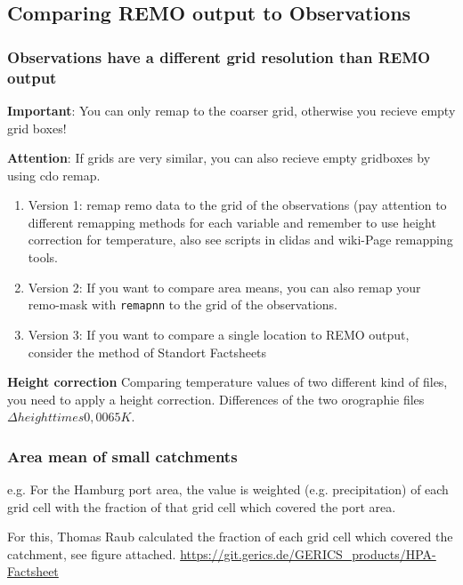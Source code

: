 \subsection{Comparing REMO output to Observations}

\subsubsection{Observations have a different grid resolution than REMO output}

\textbf{Important}: You can only remap to the coarser grid, otherwise you recieve empty grid boxes!

\textbf{Attention}: If grids are very similar, you can also recieve empty gridboxes by using cdo remap.
\begin{enumerate}
\item Version 1: remap remo data to the grid of the observations (pay attention to different remapping
methods for each variable and remember to use height correction for temperature,
also see scripts in clidas and wiki-Page remapping tools.

\item Version 2: If you want to compare area means, you can also remap your remo-mask with \texttt{remapnn} to the grid of the observations.

\item Version 3: If you want to compare a single location to REMO output, consider the method of Standort Factsheets 
\end{enumerate}

\textbf{Height correction} Comparing temperature values of two different kind of files, you need to apply a height correction. 
Differences of the two orographie files $\Delta height times 0,0065 K$.

\subsubsection{Area mean of small catchments}

e.g. For the Hamburg port area, the value is weighted (e.g. precipitation) of each grid cell with the fraction of that grid cell which covered the port area. 

For this, Thomas Raub calculated the fraction of each grid cell which covered the catchment, see figure attached. 
\url{https://git.gerics.de/GERICS_products/HPA-Factsheet}

